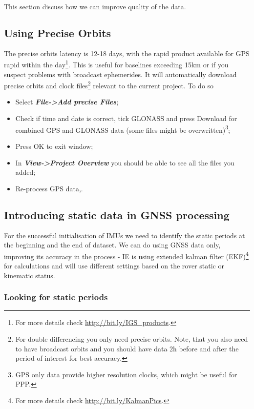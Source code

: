 \documentclass[11pt,fleqn]{book} %
\newcommand{\moreInfo}[1]{\footnote{For more details check \url{#1}.}}
\begin{document}
This section discuss how we can improve quality of the data.


\subsection{Using Precise Orbits}

The precise orbits latency is 12-18 days, with the rapid product available for GPS rapid within the day\moreInfo{http://bit.ly/IGS_products}. This is useful for baselines exceeding 15km or if you suspect problems with broadcast ephemerides. It will automatically download precise orbits and clock files\footnote{For double differencing you only need precise orbits. Note, that you also need to have broadcast orbits and you should have data 2h before and after the period of interest for best accuracy.} relevant to the current project. To do so 

\begin{itemize}
	\item Select \textbf{\emph{File->Add precise Files}};
	\item Check if time and date is correct, tick GLONASS and press Download for combined GPS and GLONASS data (some files might be overwritten)\footnote{GPS only data provide higher resolution clocks, which might be useful for PPP.};
	\item Press OK to exit window;
	\item In \textbf{\emph{View->Project Overview}} you should be able to see all the files you added;
	\item Re-process GPS data,.
\end{itemize}


\subsection{Introducing static data in GNSS processing}

For the successful initialisation of IMUs we need to identify the static periods at the beginning and the end of dataset. We can do using GNSS data only, improving its accuracy in the process - IE is using extended kalman filter (EKF)\moreInfo{http://bit.ly/KalmanPics} for calculations and will use different settings based on the rover static or kinematic status.


\subsubsection{Looking for static periods\label{sec:Static-periods}}
\end{document}
